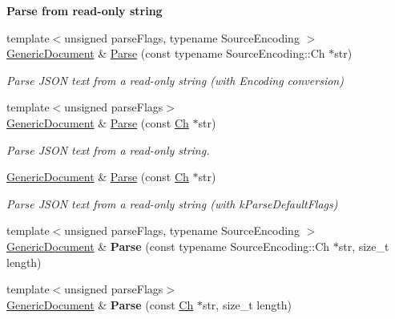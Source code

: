 \begin{Indent}{\bf Parse from read-\/only string}\par
\begin{DoxyCompactItemize}
\item 
{\footnotesize template$<$unsigned parse\+Flags, typename Source\+Encoding $>$ }\\\hyperlink{class_generic_document}{Generic\+Document} \& \hyperlink{class_generic_document_aadee36db7064cc9894a75c848831cdae}{Parse} (const typename Source\+Encoding\+::\+Ch $\ast$str)
\begin{DoxyCompactList}\small\item\em Parse J\+S\+ON text from a read-\/only string (with Encoding conversion) \end{DoxyCompactList}\item 
{\footnotesize template$<$unsigned parse\+Flags$>$ }\\\hyperlink{class_generic_document}{Generic\+Document} \& \hyperlink{class_generic_document_a5e377f840009b5cee6757be29525ce0b}{Parse} (const \hyperlink{class_generic_value_ade0e0ce64ccd5d852da57a35e720bafb}{Ch} $\ast$str)
\begin{DoxyCompactList}\small\item\em Parse J\+S\+ON text from a read-\/only string. \end{DoxyCompactList}\item 
\hyperlink{class_generic_document}{Generic\+Document} \& \hyperlink{class_generic_document_a49ae6de6fd0bc820d9864a106c10b4da}{Parse} (const \hyperlink{class_generic_value_ade0e0ce64ccd5d852da57a35e720bafb}{Ch} $\ast$str)
\begin{DoxyCompactList}\small\item\em Parse J\+S\+ON text from a read-\/only string (with k\+Parse\+Default\+Flags) \end{DoxyCompactList}\item 
{\footnotesize template$<$unsigned parse\+Flags, typename Source\+Encoding $>$ }\\\hyperlink{class_generic_document}{Generic\+Document} \& {\bfseries Parse} (const typename Source\+Encoding\+::\+Ch $\ast$str, size\+\_\+t length)\hypertarget{class_generic_document_a46b5028cc760c4e915a0d5216af9f7e2}{}\label{class_generic_document_a46b5028cc760c4e915a0d5216af9f7e2}

\item 
{\footnotesize template$<$unsigned parse\+Flags$>$ }\\\hyperlink{class_generic_document}{Generic\+Document} \& {\bfseries Parse} (const \hyperlink{class_generic_value_ade0e0ce64ccd5d852da57a35e720bafb}{Ch} $\ast$str, size\+\_\+t length)\hypertarget{class_generic_document_a93fec16eacec4f4b42075bb3bc242a6b}{}\label{class_generic_document_a93fec16eacec4f4b42075bb3bc242a6b}


\end{DoxyCompactItemize}
\end{Indent}
